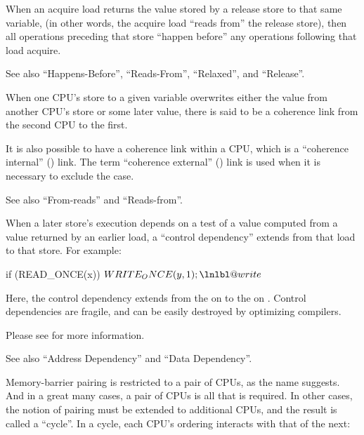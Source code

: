 \begin{description}[style=nextline]
	When an acquire load returns the value stored by a release store
	to that same variable, (in other words, the acquire load ``reads
	from'' the release store), then all operations preceding that
	store ``happen before'' any operations following that load acquire.

	See also ``Happens-Before'', ``Reads-From'', ``Relaxed'', and ``Release''.

  \item[Coherence (\tco{co}):]
	When one CPU's store to a given variable overwrites
	either the value from another CPU's store or some later value,
	there is said to be a coherence link from the second CPU to
	the first.

	It is also possible to have a coherence link within a CPU, which
	is a ``coherence internal'' () link.
	The term ``coherence external'' () link is used when it
	is necessary to exclude the  case.

	See also ``From-reads'' and ``Reads-from''.

  \item[Control Dependency:]
	When a later store's execution depends on a test
	of a value computed from a value returned by an earlier load,
	a ``control dependency'' extends from that load to that store.
	For example:

\begin{fcvlabel}
\begin{VerbatimN}[commandchars=\\\@\$]
	if (READ_ONCE(x))          \lnlbl@read$
		WRITE_ONCE(y, 1);  \lnlbl@write$
\end{VerbatimN}
\end{fcvlabel}

	\begin{fcvref}
	Here, the control dependency extends from the  on
	 to the  on .
        Control dependencies are fragile, and can be easily destroyed
	by optimizing compilers.
	\end{fcvref}
	Please see  for more information.

	See also ``Address Dependency'' and ``Data Dependency''.

  \item[Cycle:]
	Memory-barrier pairing is restricted to a pair of CPUs, as the
	name suggests.
	And in a great many cases, a pair of CPUs is all that is required.
	In other cases, the notion of pairing must be extended to
	additional CPUs, and the result is called a ``cycle''.
	In a cycle, each CPU's ordering interacts with that of the next:


\end{description}
